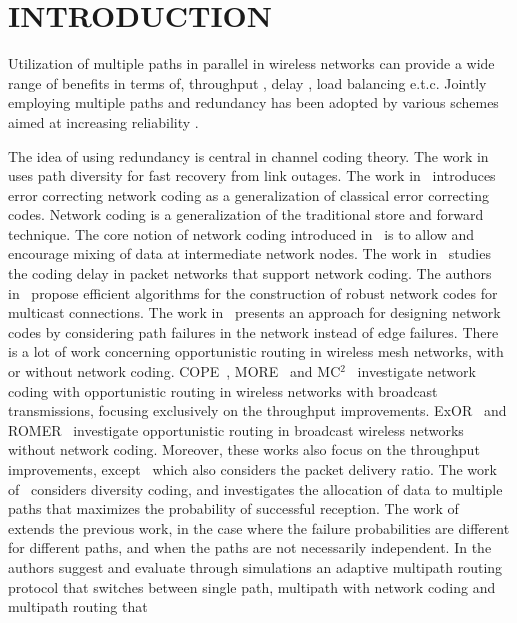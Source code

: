 \documentclass[journal, onecolumn, 12pt]{IEEEtran}
\begin{document}
\section{\uppercase{Introduction}}
\label{sec:introd}

Utilization of multiple paths in parallel in wireless networks can provide a wide range of benefits in terms of, throughput \cite{6133896}, delay \cite{mp_route_wim}, load balancing \cite{5198989} e.t.c.
Jointly employing multiple paths and redundancy has been adopted by various schemes aimed at increasing reliability \cite{Oh:2009:RMR:1702135.1702167}.

The idea of using redundancy is central in channel coding theory.
The work in~\cite{b:divcod} uses path diversity for fast recovery from link outages.
The work in~\cite{b:yeungerrcorr} introduces error correcting network coding as a generalization of classical error correcting codes.
Network coding is a generalization of the traditional store and forward technique.
The core notion of network coding introduced in~\cite{b:yeung} is to allow and encourage mixing of data at intermediate network nodes.
The work in~\cite{b:lun} studies the coding delay in packet networks that support network coding.
The authors in~\cite{b:designeffrobnet} propose efficient algorithms for the construction of robust network codes for multicast connections.
The work in~\cite{b:robnetcodpathfailure} presents an approach for designing network codes by considering path failures in the network instead of edge failures.
There is a lot of work concerning opportunistic routing in wireless mesh networks, with or without network coding.
COPE~\cite{b:cope}, MORE~\cite{b:more} and MC$^{2}$~\cite{b:mc2} investigate network coding with opportunistic routing in wireless networks with broadcast transmissions, focusing exclusively on the throughput improvements.
ExOR~\cite{b:exor} and ROMER~\cite{b:romer} investigate opportunistic routing in broadcast wireless networks without network coding.
Moreover, these works also focus on the throughput improvements, except~\cite{b:romer} which also considers the packet delivery ratio.
The work of~\cite{b:tsirig1} considers diversity coding, and investigates the allocation of data to multiple paths that maximizes the probability of successful reception.
The work of~\cite{b:tsirig2} extends the previous work, in the case where the failure probabilities are different for different paths, and when the paths are not necessarily independent.
In \cite{Oh:2009:RMR:1702135.1702167} the authors suggest and evaluate through simulations an adaptive multipath routing protocol that switches between single path, multipath with network coding and multipath routing that
\end{document}
